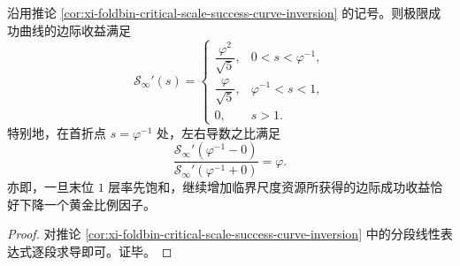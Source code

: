 \begin{corollary}\label{cor:xi-foldbin-critical-scale-marginal-gain-phi-drop}
沿用推论 \ref{cor:xi-foldbin-critical-scale-success-curve-inversion} 的记号。则极限成功曲线的边际收益满足
\[
\mathcal S_\infty'(s)=
\begin{cases}
\dfrac{\varphi^2}{\sqrt5}, & 0<s<\varphi^{-1},\\[6pt]
\dfrac{\varphi}{\sqrt5}, & \varphi^{-1}<s<1,\\[6pt]
0, & s>1.
\end{cases}
\]
特别地，在首折点 \(s=\varphi^{-1}\) 处，左右导数之比满足
\[
\boxed{\;
\frac{\mathcal S_\infty'(\varphi^{-1}-0)}{\mathcal S_\infty'(\varphi^{-1}+0)}=\varphi.\;}
\]
亦即，一旦末位 \(1\) 层率先饱和，继续增加临界尺度资源所获得的边际成功收益恰好下降一个黄金比例因子。
\end{corollary}
\begin{proof}
对推论 \ref{cor:xi-foldbin-critical-scale-success-curve-inversion} 中的分段线性表达式逐段求导即可。证毕。
\end{proof}

